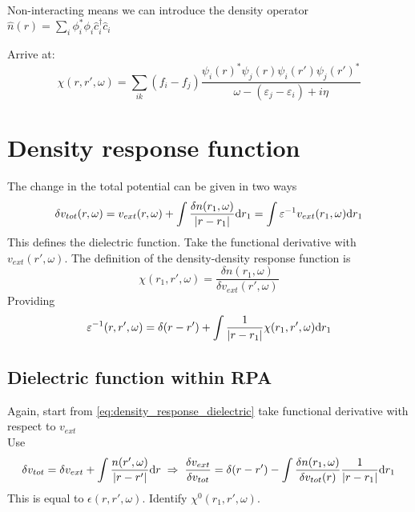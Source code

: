 \documentclass{article}
\begin{document}
Non-interacting means we can introduce the density operator $\hat{n}(r) =  \sum_i \phi_i^* \phi_i \hat{c}^{\dagger}_i \hat{c}_i$

Arrive at:
\begin{equation}
    \chi(r,r',\omega) = \sum_{ik} (f_i-f_j)\dfrac{\psi_i(r)^{*}\psi_j(r)\psi_i(r')\psi_j(r')^{*}}{\omega-(\varepsilon_j-\varepsilon_i)+i\eta}
\end{equation}



\newpage
\section{Density response function}
The change in the total potential can be given in two ways
\begin{equation}\label{eq:density_response_dielectric}
    \delta v_{tot}(r,\omega) = v_{ext}(r,\omega) + \int \frac{\delta n(r_1,\omega)}{\abs{r-r_1}} \mathrm{d}r_1 = \int \varepsilon^{-1} v_{ext}(r_1,\omega) \mathrm{d}r_1
\end{equation}
This defines the dielectric function. Take the functional derivative with $v_{ext}(r',\omega)$. The definition of the density-density response function is
\begin{equation}
    \chi(r_1,r',\omega) = \frac{\delta n(r_1,\omega)}{\delta v_{ext} (r',\omega)}
\end{equation}
Providing
\begin{equation}
    \varepsilon^{-1}(r,r',\omega) = \delta(r-r') + \int \frac{1}{\abs{r-r_1}} \chi(r_1,r',\omega) \mathrm{d}r_1
\end{equation}

\subsection{Dielectric function within RPA}
Again, start from \eqref{eq:density_response_dielectric} take functional derivative with respect to $v_{ext}$\\
Use
\begin{equation}
    \delta v_{tot} = \delta v_{ext} + \int \dfrac{n(r',\omega)}{\abs{r-r'}}\mathrm{d}r \; \Rightarrow \; \dfrac{\delta v_{ext}}{\delta v_{tot}} = \delta(r-r') - \int \dfrac{\delta n(r_1,\omega)}{\delta v_{tot}(r)}\dfrac{1}{\abs{r-r_1}}\mathrm{d}r_1
\end{equation}
This is equal to $\epsilon(r,r',\omega)$. Identify $\chi^{0}(r_1,r',\omega)$.
\end{document}
